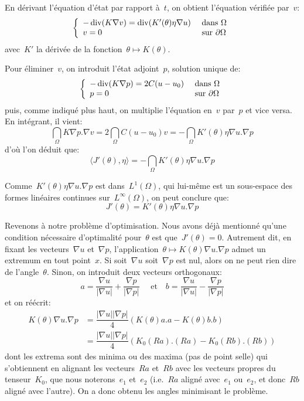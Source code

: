 En dérivant l'équation d'état par rapport à~$t$, on obtient l'équation vérifiée par~$v$:
\[\left\{\begin{array}{ll} -\operatorname{div}(K\nabla v)=\operatorname{div}(K'(\theta)\eta\nabla u) &\text{ dans }\Omega \\ v=0 &\text{ sur }\partial\Omega \end{array}\right. \]
avec~$K'$ la dérivée de la fonction~$\theta \mapsto K(\theta)$.

Pour éliminer~$v$, on introduit l'état adjoint~$p$, solution unique de:
\[\left\{\begin{array}{ll} -\operatorname{div}(K\nabla p)=2C(u-u_0) &\text{ dans }\Omega \\ p=0 &\text{ sur }\partial\Omega \end{array}\right. \]
puis, comme indiqué plus haut, on multiplie l'équation en~$v$ par~$p$ et vice versa. En intégrant, il vient:
\[ \dint_\Omega K\nabla p.\nabla v = 2\dint_\Omega C(u-u_0)v = -\dint_\Omega K'(\theta)\eta\nabla u.\nabla p \]
d'où l'on déduit que:
\[ \langle J'(\theta),\eta\rangle =  -\dint_\Omega K'(\theta)\eta\nabla u.\nabla p \]

Comme~$K'(\theta)\eta\nabla u.\nabla p$ est dans~$L^1(\Omega)$, qui lui-même est un sous-espace des formes linéaires continues sur~$L^\infty(\Omega)$, on peut conclure que:
\[ J'(\theta) =  K'(\theta)\eta\nabla u.\nabla p \]

\medskip
Revenons à notre problème d'optimisation. Nous avons déjà mentionné qu'une condition nécessaire d'optimalité pour~$\theta$ est que~$J'(\theta)=0$. Autrement dit, en fixant les vecteurs~$\nabla u$ et~$\nabla p$, l'application~$\theta \mapsto K(\theta)\nabla u.\nabla p$ admet un extremum en tout point~$x$. Si soit~$\nabla u$ soit~$\nabla p$ est nul, alors on ne peut rien dire de l'angle~$\theta$. Sinon, on introduit deux vecteurs orthogonaux:
\[ a=\dfrac{\nabla u}{|\nabla u|}+\dfrac{\nabla p}{|\nabla p|} \quad \text{ et}\quad
b=\dfrac{\nabla u}{|\nabla u|}-\dfrac{\nabla p}{|\nabla p|} \]
et on réécrit:
\[\begin{array}{ll}
K(\theta)\nabla u.\nabla p &= \dfrac{|\nabla u||\nabla p|}{4}(K(\theta)a.a -K(\theta)b.b)\\
&= \dfrac{|\nabla u||\nabla p|}{4}(K_0(Ra).(Ra)-K_0(Rb).(Rb))
\end{array}\]
dont les extrema sont des minima ou des maxima (pas de point selle) qui s'obtiennent en alignant les vecteurs~$Ra$ et~$Rb$ avec les vecteurs propres du tenseur~$K_0$, que nous noterons~$e_1$ et~$e_2$ (i.e.~$Ra$ aligné avec~$e_1$ ou~$e_2$, et donc~$Rb$ aligné avec l'autre).
On a donc obtenu les angles minimisant le problème.


